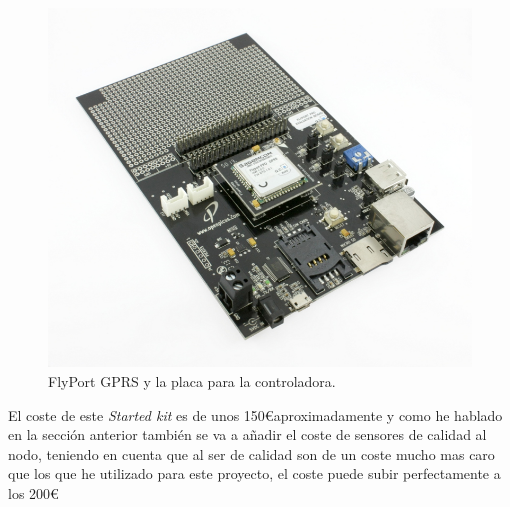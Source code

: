 \begin{figure}[!h]
	\centering
	\includegraphics[width=0.5\linewidth]{figuras/flyportimg}
	\caption{FlyPort GPRS y la placa para la controladora.\cite{FlyPort}}
	\label{fig:flyportimg}
\end{figure}

El coste de este \textit{Started kit} es de unos 150\euro aproximadamente y como he hablado en la sección anterior también se va a añadir el coste de sensores de calidad al nodo, teniendo en cuenta que al ser de calidad son de un coste mucho mas caro que los que he utilizado para este proyecto, el coste puede subir perfectamente a los 200\euro

